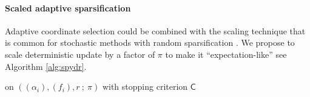 \paragraph{Scaled adaptive sparsification}
{Adaptive coordinate selection could be combined with the scaling technique that is common for stochastic methods with random sparsification \cite{zhang2014asynchronous}. We propose to scale deterministic update by a factor of $\pi$ to make it ``expectation-like'' see Algorithm \ref{alg:spydr}.


\begin{algorithm}
\caption{\textsc{\maskalgo} on $((\alpha_i),(f_i), r  ~ ; ~  \pi)$ with stopping criterion $\mathsf{C}$}
\label{alg:spydr}
\begin{center}


\end{center}
\end{algorithm}}
